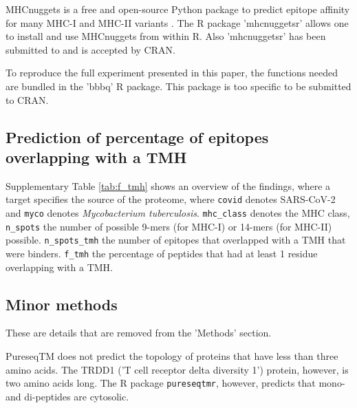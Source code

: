 MHCnuggets is a free and open-source Python package to predict 
epitope affinity for many MHC-I and MHC-II variants \cite{shao2020high}.
The R package 'mhcnuggetsr' allows one to install and use MHCnuggets
from within R.
Also 'mhcnuggetsr' has been submitted to and is accepted by CRAN.


To reproduce the full experiment presented in this paper,
the functions needed are bundled in the 'bbbq' R package.
This package is too specific to be submitted to CRAN.

\subsection{Prediction of percentage of epitopes overlapping with a TMH}

Supplementary Table \ref{tab:f_tmh} shows an overview of the findings,
where a target specifies the source of the proteome,
where \verb;covid; denotes SARS-CoV-2 and \verb;myco; denotes
\emph{Mycobacterium tuberculosis}. \verb;mhc_class; denotes the MHC
class, \verb;n_spots; the number of possible 9-mers (for MHC-I) 
or 14-mers (for MHC-II) possible. \verb;n_spots_tmh; the
number of epitopes that overlapped with a TMH that were binders. 
\verb;f_tmh; the percentage of peptides that had at least 1 residue
overlapping with a TMH.



\subsection{Minor methods}

These are details that are removed from the 'Methods' section.

PureseqTM does not predict the topology
of proteins that have less than three amino acids. 
The TRDD1 ('T cell receptor delta diversity 1') protein,
however, is two amino acids long. 
The R package \verb;pureseqtmr;, however, 
predicts that mono- and di-peptides are cytosolic. 


